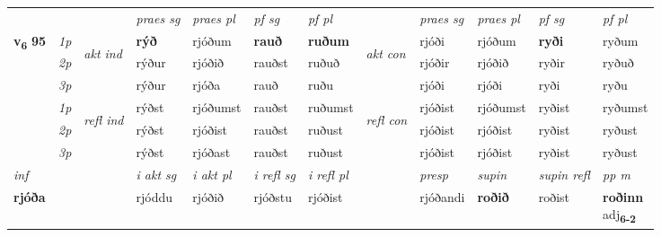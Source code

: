 \begin{longtable}[l]{X>{\footnotesize\itshape}llXXXXlXXXX}
\midrule

 & &   & \textit{praes sg}  & \textit{praes pl}    & \textit{ pf sg} & \textit{pf pl} & & \textit{praes sg}  & \textit{praes pl}    & \textit{pf sg} & \textit{pf pl }  \\ \cmidrule{4-7} \cmidrule{9-12}
 \multirow{2}{*}{{{\textbf{v{\textsubscript{6}}} \Large{\textbf{95}}}}}  & 1p & \multirow{3}{*}{\begin{turn}{90}\textit{akt ind}\end{turn}} & \textbf{rýð} & rjóðum & \textbf{rauð} & \textbf{ruðum} & \multirow{3}{*}{\begin{turn}{90}\textit{akt con}\end{turn}} &rjóði & rjóðum & \textbf{ryði} & ryðum\\*
 & 2p &  &  rýður  & rjóðið & rauðst & ruðuð & & rjóðir & rjóðið & ryðir & ryðuð \\*
 & 3p &  & rýður & rjóða & rauð & ruðu & & rjóði & rjóði& ryði & ryðu \\*
\cmidrule{4-7} \cmidrule{9-12}
 & 1p & \multirow{3}{*}{\begin{turn}{90}\textit{refl ind}\end{turn}}  & rýðst & rjóðumst & rauðst & ruðumst & \multirow{3}{*}{\begin{turn}{90}\textit{refl con}\end{turn}}  &rjóðist & rjóðumst & ryðist & ryðumst \\*
 & 2p &  & rýðst & rjóðist & rauðst & ruðust & &rjóðist & rjóðist & ryðist & ryðust \\*
 & 3p  & & rýðst & rjóðast & rauðst & ruðust & & rjóðist & rjóðist& ryðist & ryðust \\*
\cmidrule{4-7} \cmidrule{9-12}

   {\textit{inf}} & &  & \textit{i akt sg} & \textit{i akt pl} & \textit{i refl sg} & \textit{i refl pl} && \textit{presp} & \textit{supin} & \textit{supin refl} & \textit{pp m} \\*
  {\textbf{rjóða}} & && rjóddu  & rjóðið & rjóðstu & rjóðist && rjóðandi &  \textbf{roðið} & roðist & \specialcell{\textbf{roðinn} \\ adj\textbf{\textsubscript{6-2}}} \\*

\midrule


\end{longtable}
